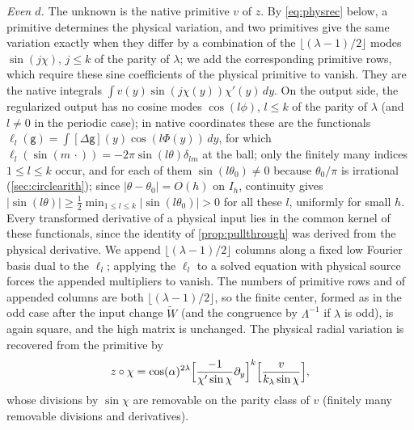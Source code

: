 \documentclass[11pt]{amsart}
\numberwithin{equation}{section}
\theoremstyle{definition}
\theoremstyle{remark}
\newcommand{\abs}[1]{\lvert #1\rvert}
\begin{document}
\emph{Even $d$.} The unknown is the native primitive $v$ of $z$. By \eqref{eq:physrec} below, a primitive determines the physical variation, and two primitives give the same variation exactly when they differ by a combination of the $\lfloor(\lambda-1)/2\rfloor$ modes $\sin(j\chi)$, $j\le k$ of the parity of $\lambda$; we add the corresponding primitive rows, which require these sine coefficients of the physical primitive to vanish. They are the native integrals $\int v(y)\sin(j\chi(y))\chi'(y)\,dy$. On the output side, the regularized output has no cosine modes $\cos(l\phi)$, $l\le k$ of the parity of $\lambda$ (and $l\ne0$ in the periodic case); in native coordinates these are the functionals $\ell_l(\mathsf g)=\int[\Delta\mathsf g](y)\cos(l\Phi(y))\,dy$, for which $\ell_l(\sin(m\,\cdot))=-2\pi\sin(l\theta)\delta_{lm}$ at the ball; only the finitely many indices $1\le l\le k$ occur, and for each of them $\sin(l\theta_0)\ne0$ because $\theta_0/\pi$ is irrational (\cref{sec:circlearith}); since $\abs{\theta-\theta_0}=O(h)$ on $I_h$, continuity gives $\abs{\sin(l\theta)}\ge\frac12\min_{1\le l\le k}\abs{\sin(l\theta_0)}>0$ for all these $l$, uniformly for small $h$. Every transformed derivative of a physical input lies in the common kernel of these functionals, since the identity of \cref{prop:pullthrough} was derived from the physical derivative. We append $\lfloor(\lambda-1)/2\rfloor$ columns along a fixed low Fourier basis dual to the $\ell_l$; applying the $\ell_l$ to a solved equation with physical source forces the appended multipliers to vanish. The numbers of primitive rows and of appended columns are both $\lfloor(\lambda-1)/2\rfloor$, so the finite center, formed as in the odd case after the input change $\widetilde W$ (and the congruence by $\Lambda^{-1}$ if $\lambda$ is odd), is again square, and the high matrix is unchanged. The physical radial variation is recovered from the primitive by
\begin{equation}\label{eq:physrec}
z\circ\chi=\cos(\alpha)^{2\lambda}\Bigl[\frac{-1}{\chi'\sin\chi}\partial_y\Bigr]^k\Bigl[\frac v{k_\lambda\sin\chi}\Bigr],
\end{equation}
whose divisions by $\sin\chi$ are removable on the parity class of $v$ (finitely many removable divisions and derivatives).
\end{document}
